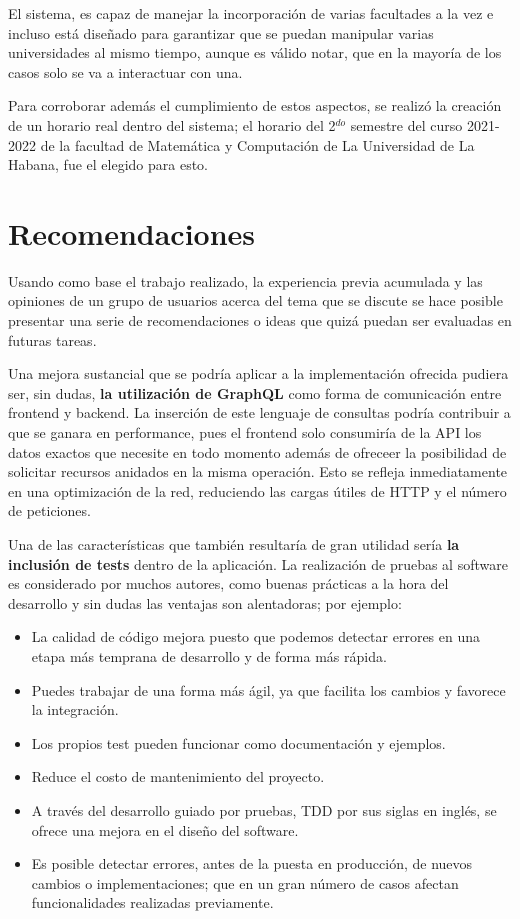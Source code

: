 El sistema, es capaz de manejar la incorporación de varias facultades a la vez e incluso está diseñado para garantizar que se puedan manipular varias universidades al mismo tiempo, aunque es válido notar, que en la mayoría de los casos solo se va a interactuar con una. 

Para corroborar además el cumplimiento de estos aspectos, se realizó la creación de un horario real dentro del sistema; el horario del 2$^{do}$ semestre del curso 2021-2022 de la facultad de Matemática y Computación de La Universidad de La Habana, fue el elegido para esto. 

\section{Recomendaciones}

Usando como base el trabajo realizado, la experiencia previa acumulada y las opiniones de un grupo de usuarios acerca del tema que se discute se hace posible presentar una serie de recomendaciones o ideas que quizá puedan ser evaluadas en futuras tareas.

Una mejora sustancial que se podría aplicar a la implementación ofrecida pudiera ser, sin dudas, \textbf{la utilización de GraphQL} \cite{GraphQL_doc} como forma de comunicación entre frontend y backend. La inserción de este lenguaje de consultas podría contribuir a que se ganara en performance, pues el frontend solo consumiría de la API los datos exactos que necesite en todo momento además de ofreceer la posibilidad de solicitar recursos anidados en la misma operación. Esto se refleja inmediatamente en una optimización de la red, reduciendo las cargas útiles de HTTP y el número de peticiones. 

Una de las características que también resultaría de gran utilidad sería \textbf{la inclusión de tests} dentro de la aplicación. La realización de pruebas al software es considerado por muchos autores, como buenas prácticas a la hora del desarrollo y sin dudas las ventajas son alentadoras; por ejemplo: \cite{testing} 
\begin{itemize}
	\item La calidad de código mejora puesto que podemos detectar errores en una etapa más temprana de desarrollo y de forma más rápida.
	\item Puedes trabajar de una forma más ágil, ya que facilita los cambios y favorece la integración.
	\item Los propios test pueden funcionar como documentación y ejemplos.
	\item Reduce el costo de mantenimiento del proyecto.
	\item A través del desarrollo guiado por pruebas, TDD por sus siglas en inglés, se ofrece una mejora en el diseño del software.
	\item Es posible detectar errores, antes de la puesta en producción, de nuevos cambios o implementaciones; que en un gran número de casos afectan funcionalidades realizadas previamente.
\end{itemize}

